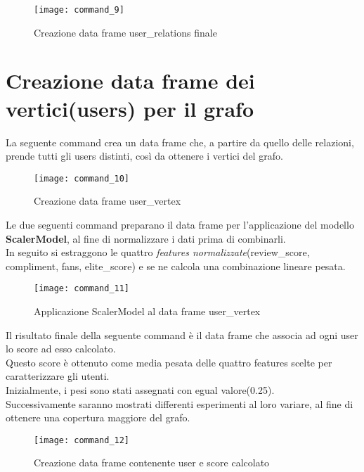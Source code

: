 \begin{figure}[!htbp]
	\texttt{[image: command\_9]}
	\caption{Creazione data frame user\_relations finale}
	\label{command_9}
\end{figure}

\clearpage

\section{Creazione data frame dei vertici(users) per il grafo}
La seguente command crea un data frame che, a partire da quello delle relazioni,
prende tutti gli users distinti, così da ottenere i vertici
del grafo.
\begin{figure}[!htbp]
	\texttt{[image: command\_10]}
	\caption{Creazione data frame user\_vertex}
	\label{command_10}
\end{figure}

Le due seguenti command preparano il data frame per l'applicazione del modello
\textbf{ScalerModel}, al fine di normalizzare i dati prima di combinarli.\\
In seguito si estraggono le quattro \textit{features normalizzate}(review\_score,
compliment, fans, elite\_score) e se ne calcola una combinazione lineare pesata.
\begin{figure}[!htbp]
	\texttt{[image: command\_11]}
	\caption{Applicazione ScalerModel al data frame user\_vertex}
	\label{command_11}
\end{figure}

\clearpage

Il risultato finale della seguente command è il data frame che associa ad ogni user
lo score ad esso calcolato.\\
Questo score è ottenuto come media pesata delle quattro features scelte per
caratterizzare gli utenti.\\
Inizialmente, i pesi sono stati assegnati con egual valore(0.25).\\
Successivamente saranno mostrati differenti esperimenti al loro variare, al fine
di ottenere una copertura maggiore del grafo.
\begin{figure}[!htbp]
 	\texttt{[image: command\_12]}
 	\caption{Creazione data frame contenente user e score calcolato}
 	\label{command_12}
\end{figure}
